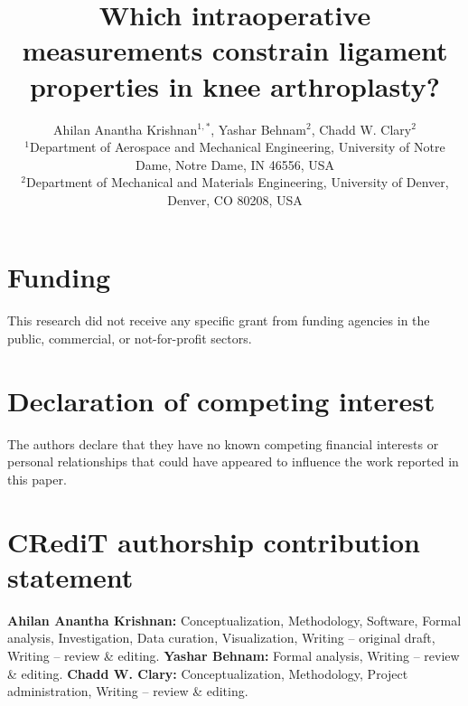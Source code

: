 \documentclass{article}
\begin{document}
\title{Which intraoperative measurements constrain ligament properties in knee arthroplasty?}

\author{
Ahilan Anantha Krishnan$^{1,*}$, Yashar Behnam$^{2}$, Chadd W. Clary$^{2}$\\
$^{1}$Department of Aerospace and Mechanical Engineering, University of Notre Dame, Notre Dame, IN 46556, USA\\
$^{2}$Department of Mechanical and Materials Engineering, University of Denver, Denver, CO 80208, USA\\
}

\date{}

\maketitle

\begingroup
\renewcommand{\thefootnote}{*}
\endgroup



\section*{Funding}
This research did not receive any specific grant from funding agencies in the public, commercial, or not-for-profit sectors.

\section*{Declaration of competing interest}
The authors declare that they have no known competing financial interests or personal relationships that could have appeared to influence the work reported in this paper.

\section*{CRediT authorship contribution statement}
\textbf{Ahilan Anantha Krishnan:} Conceptualization, Methodology, Software, Formal analysis, Investigation, Data curation, Visualization, Writing -- original draft, Writing -- review \& editing.
\textbf{Yashar Behnam:} Formal analysis, Writing -- review \& editing.
\textbf{Chadd W. Clary:} Conceptualization, Methodology, Project administration, Writing -- review \& editing.
\end{document}
